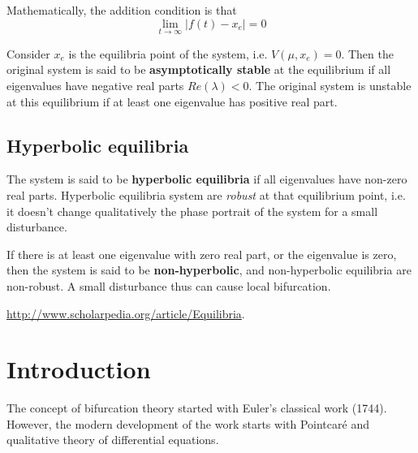 Mathematically, the addition condition is that
\begin{equation}
  \label{eq:655}
  \lim_{t\rightarrow \infty} |f(t)-x_e| = 0
\end{equation}

Consider $x_e$ is the equilibria point of the system,
i.e. $V(\mu,x_e)=0$. Then the original system is said to be
{\bf asymptotically stable} at the equilibrium if all eigenvalues have
negative real parts $Re(\lambda)<0$. The original system is unstable
at this equilibrium if at least one eigenvalue has positive real part.

\subsection{Hyperbolic equilibria}
\label{sec:hyperb-equil}

The system is said to be {\bf hyperbolic equilibria} if all
eigenvalues have non-zero real parts. Hyperbolic equilibria system are
{\it robust} at that equilibrium point, i.e. it doesn't change
qualitatively the phase portrait of the system for a small
disturbance.

If there is at least one eigenvalue with zero real part, or the
eigenvalue is zero, then the system is said to be {\bf
  non-hyperbolic}, and non-hyperbolic equilibria are non-robust. A
small disturbance thus can cause local bifurcation.

\url{http://www.scholarpedia.org/article/Equilibria}.

\section{Introduction}
\label{sec:introduction-3}

The concept of bifurcation theory started with Euler's classical work
(1744). However, the modern development of the work starts with
Pointcar\'e and qualitative theory of differential equations. 

